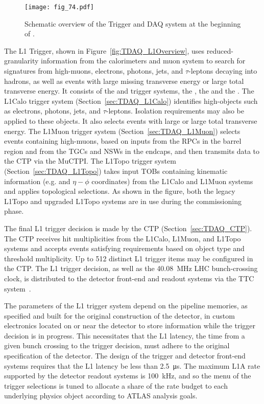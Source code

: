 \documentclass[cernpreprint, atlasdraft=false, UKenglish,british,orcidlogo, texmf, orcidlogo]{atlasdoc}
\begin{document}
\begin{figure}[b]
\centerline{\texttt{[image: fig\_74.pdf]}}
\caption{Schematic overview of the Trigger and DAQ system at the beginning of \RunThr.}
\label{fig:TDAQ_Overview}       
\end{figure}
 
The \gls{L1} Trigger, shown in Figure~\ref{fig:TDAQ_L1Overview}, uses reduced-granularity information from the calorimeters and muon system to search for signatures from high-\pT muons, electrons, photons, jets, and $\tau$-leptons decaying into hadrons, as well as events with large missing transverse energy or large total transverse energy.  It consists of the  and  trigger systems, the , the  and the . The \gls{L1Calo} trigger system (Section~\ref{sec:TDAQ_L1Calo}) identifies high-\ET objects such as electrons, photons, jets, and $\tau$-leptons.  Isolation requirements may also be applied to these objects.  It also selects events with large \MET or large total transverse energy.  The \gls{L1Muon} trigger system (Section~\ref{sec:TDAQ_L1Muon}) selects events containing high-\pT muons, based on inputs from the \glspl{RPC} in the barrel region and from the \glspl{TGC} and \glspl{NSW} in the endcaps, and then transmits data to the \gls{CTP} via the \gls{MuCTPI}. The \gls{L1Topo} trigger system (Section~\ref{sec:TDAQ_L1Topo}) takes input \glspl{TOB} containing kinematic information (e.g. \ET and $\eta-\phi$ coordinates) from the \gls{L1Calo} and \gls{L1Muon} systems and applies topological selections. As shown in the figure, both the legacy \gls{L1Topo} and upgraded \gls{L1Topo} systems are in use during the commissioning phase.
 
The final \gls{L1} trigger decision is made by the \gls{CTP} (Section~\ref{sec:TDAQ_CTP}).  The \gls{CTP} receives hit multiplicities from the \gls{L1Calo}, \gls{L1Muon}, and \gls{L1Topo} systems and accepts events satisfying requirements based on object type and threshold multiplicity.  Up to 512 distinct \gls{L1} trigger items may be configured in the \gls{CTP}.  The \gls{L1} trigger decision, as well as the 40.08~MHz \gls{LHC} bunch-crossing clock, is distributed to the detector front-end and readout systems via the \gls{TTC} system~\cite{bib:ttc}.
 
The parameters of the \gls{L1} trigger system depend on the pipeline memories, as specified and built for the original construction of the detector,  in custom electronics located on or near the detector to store information while the trigger decision is in progress.
This necessitates that the \RunThr \gls{L1} latency, the time from a given bunch crossing to the trigger decision, must adhere to the original specification of the detector.
The design of the trigger and detector front-end systems requires that the \gls{L1} latency be less than \SI{2.5}{\micro\s}.  The maximum \gls{L1A} rate supported by the detector readout systems is \SI{100}{\kHz}, and so the menu of the trigger selections is tuned to allocate a share of the rate budget to each underlying physics object according to ATLAS analysis goals.
 
\end{document}
